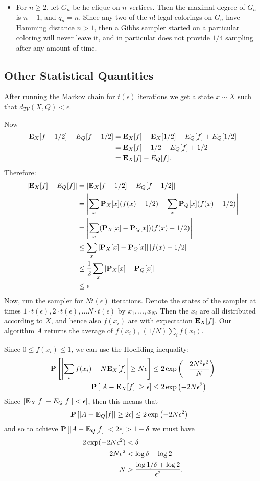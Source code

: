 \documentclass[11pt]{article} \usepackage{amssymb}
\newcommand{\E}{{\bf E}} \newcommand{\Cov}{{\bf Cov}}
\begin{document}
\begin{itemize}
\item
For $n \geq 2$, let $G_n$ be he clique on $n$ vertices. Then the maximal degree
of $G_n$ is $n-1$, and $q_n=n$. Since any two of the $n!$ legal colorings on 
$G_n$ have
Hamming distance $n>1$, then a Gibbs sampler started on a particular coloring
will never leave it, and in particular does not provide $1/4$ sampling after
any amount of time.


\end{itemize}
\subsection{Other Statistical Quantities}
After running the Markov chain for $t(\epsilon)$ iterations we get a state
$x \sim X$ such that $d_{TV}(X,Q)<\epsilon$. 

Now
\begin{align*}
  \E_X[f-1/2]-E_Q[f-1/2] &=\E_X[f]-\E_X[1/2]-E_Q[f]+E_Q[1/2]
  \\ &= \E_X[f]-1/2-E_Q[f]+1/2
  \\ &= \E_X[f]-E_Q[f].
\end{align*}
Therefore:
\begin{align*}
  |\E_X[f]-E_Q[f]| &= |\E_X[f-1/2]-E_Q[f-1/2]|
  \\ &= \left|\sum_x\P_X[x](f(x)-1/2)-\sum_x\P_Q[x](f(x)-1/2)\right|
  \\ &= \left|\sum_x(\P_X[x]-\P_Q[x])(f(x)-1/2)\right|
  \\ &\leq \sum_x\left|\P_X[x]-\P_Q[x]\right| |f(x)-1/2|
  \\ &\leq {1\over 2}\sum_x\left|\P_X[x]-\P_Q[x]\right|
  \\ &\leq \epsilon
\end{align*}
Now, run the sampler for $Nt(\epsilon)$ iterations. 
Denote the states of the sampler at times 
$1\cdot t(\epsilon),2\cdot t(\epsilon),\ldots N\cdot t(\epsilon)$ by
$x_1,\ldots,x_N$. Then the $x_i$ are all distributed according
to $X$, and hence also $f(x_i)$ are with expectation $\E_X[f]$. Our
algorithm $A$ returns the average of $f(x_i)$, $(1/N)\sum_i f(x_i)$.

Since $0 \leq f(x_i) \leq 1$, we can use the Hoeffding inequality:
\begin{align*}
  \P\left[\left|\sum_if(x_i)-N\E_X[f]\right|\geq N\epsilon\right] &\leq 
    2\exp\left(-{2N^2\epsilon^2\over N}\right)
\\   \P\left[\left|A-\E_X[f]\right|\geq \epsilon\right] &\leq 
    2\exp\left(-2N\epsilon^2\right)
\end{align*}
Since $|\E_X[f]-E_Q[f]|<\epsilon|$, then this means that
\begin{align*}
   \P\left[\left|A-\E_Q[f]\right|\geq 2\epsilon\right] &\leq 
    2\exp\left(-2N\epsilon^2\right)
\end{align*}
and so to achieve $\P\left[\left|A-\E_Q[f]\right| < 2\epsilon\right]>1-\delta$
we must have
\begin{align*}
  2\exp(-2N\epsilon^2)&<\delta
  \\ -2N\epsilon^2&<\log\delta-\log 2
  \\ N &> {\log 1/\delta+\log 2\over \epsilon^2}.
\end{align*}
\end{document}

